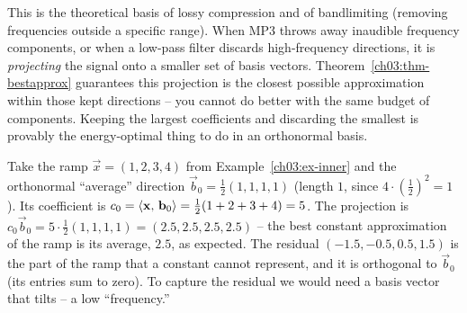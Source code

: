 \begin{whybox}
This is the theoretical basis of lossy compression and of bandlimiting (removing frequencies outside a specific range). When MP3 throws away
inaudible frequency components, or when a low-pass filter discards high-frequency directions, it is
\emph{projecting} the signal onto a smaller set of basis vectors. Theorem~\ref{ch03:thm-bestapprox}
guarantees this projection is the closest possible approximation within those kept directions -- you
cannot do better with the same budget of components. Keeping the largest coefficients and discarding
the smallest is provably the energy-optimal thing to do in an orthonormal basis.
\end{whybox}

\begin{example}
\label{ch03:ex-approx}
Take the ramp $\vec{x}=(1,2,3,4)$ from Example~\ref{ch03:ex-inner} and the orthonormal ``average''
direction $\vec{b}_0=\tfrac12(1,1,1,1)$ (length $1$, since $4\cdot(\tfrac12)^2=1$). Its coefficient
is $c_0=\langle \mathbf{x},\, \mathbf{b}_0 \rangle=\tfrac12(1+2+3+4)=5$. The projection is
$c_0\vec{b}_0 = 5\cdot\tfrac12(1,1,1,1)=(2.5,2.5,2.5,2.5)$ -- the best constant approximation of the
ramp is its average, $2.5$, as expected. The residual $(-1.5,-0.5,0.5,1.5)$ is the
part of the ramp that a constant cannot represent, and it is orthogonal to $\vec{b}_0$ (its entries
sum to zero). To capture the residual we would need a basis vector that tilts -- a low ``frequency.''
\end{example}

